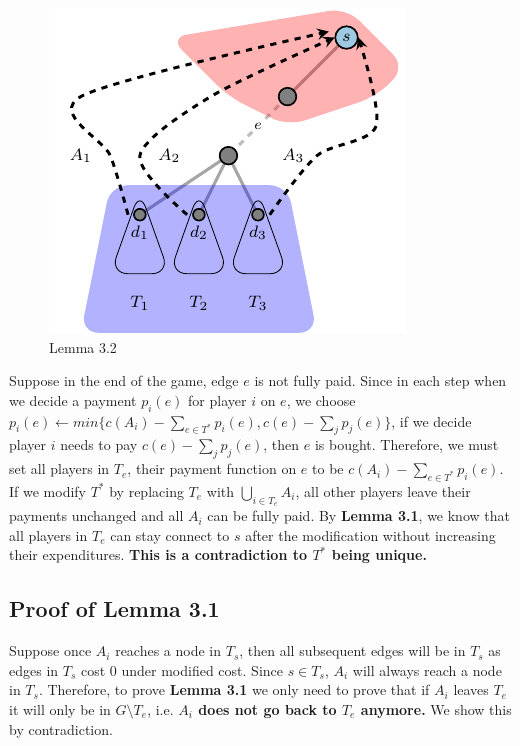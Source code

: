 \documentclass[11pt,psfig,times]{article}
\begin{document}
	\begin{figure}[H]
		\begin{center}
		\includegraphics{pictures/lemma3.2.pdf}
		\end{center}
		\caption{Lemma 3.2}
		\label{fig:Lemma3.2}
	\end{figure}
			
 Suppose in the end of the game, edge $e$ is not fully paid. Since in each step when we decide a payment $p_i(e)$ for player $i$ on $e$, we choose \(p_i(e) \gets min\{c(A_i) - \sum_{e\in T^*}p_i(e), c(e)-\sum_{j}p_j(e) \}\), if we decide player $i$ needs to pay $c(e)-\sum_{j}p_j(e) $, then $e$ is bought. Therefore, we must set all players in $T_e$, their payment function on $e$ to be $c(A_i) - \sum_{e\in T^*}p_i(e)$. If we modify $T^*$ by replacing $T_e$ with \(\bigcup_{i\in T_e} A_i\), all other players leave their payments unchanged and all $A_i$ can be fully paid. By \textbf{Lemma 3.1}, we know that all players in $T_e$ can stay connect to $s$ after the modification without increasing their expenditures. \textbf{This is a contradiction to $T^*$ being unique.}

\subsection{Proof of Lemma 3.1}
Suppose once $A_i$ reaches a node in $T_s$, then all subsequent edges will be in $T_s$ as edges in $T_s$ cost 0 under modified cost. Since $s \in T_s$, $A_i$ will always reach a node in $T_s$. Therefore, to prove \textbf{Lemma 3.1} we only need to prove that if $A_i$ leaves $T_e$ it will only be in $G\setminus T_e$, i.e. \textbf{$A_i$ does not go back to $T_e$ anymore.} We show this by contradiction. 
\end{document}
